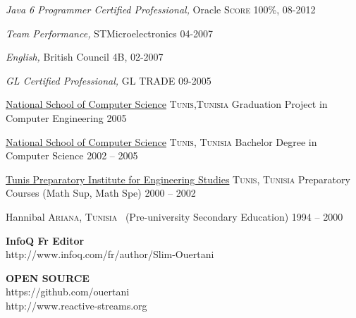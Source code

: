 \documentclass[10pt,a4paper]{article}
\begin{document}
\headedsection
  {{\sl \textit {Java 6 Programmer Certified Professional},} Oracle}
  {\textsc{Score 100\%, 08-2012}} 
  
\headedsection
  {{\sl \textit {Team Performance},} STMicroelectronics}
  {\textsc{04-2007}} 

\headedsection
  {{\sl \textit {English},} British Council}
  {\textsc{4B, 02-2007}} 
  
\headedsection
  {{\sl \textit {GL Certified Professional},} GL TRADE}
  {\textsc{09-2005}} 

\spacedhrule{0em}{-0.4em}



\headedsection
  {\href{http://www.ensi.rnu.tn/}{ National School of Computer Science}}
  {\textsc{Tunis,Tunisia}} {%
  \headedsubsection
    {Graduation Project in Computer Engineering}
    {2005}{}
}

\headedsection
 {\href{http://www.ensi.rnu.tn/}{ National School of Computer Science}}
  {\textsc{Tunis, Tunisia}} {%
  \headedsubsection
    {Bachelor Degree in Computer Science}
    {2002 -- 2005} {}
}



\headedsection
  {\href{http://www.ipeit.rnu.tn/en}{Tunis Preparatory Institute for Engineering Studies}}
  {\textsc{Tunis, Tunisia}} {%
  \headedsubsection
    {Preparatory Courses (Math Sup, Math Spe)}
    {2000 -- 2002} {}
}

\headedsection
  {{Hannibal}}
  {\textsc{Ariana, Tunisia}} {%
  \headedsubsection
    { \textnormal{~(Pre-university Secondary Education)}}
    {1994 -- 2000} {}
}

\spacedhrule{0em}{-0.4em}

\begin{multicols}{2}

{\bf  InfoQ Fr Editor} \\
http://www.infoq.com/fr/author/Slim-Ouertani 

\columnbreak

{\bf  OPEN SOURCE } \\
https://github.com/ouertani  \\
http://www.reactive-streams.org

\end{multicols}
\end{document}
